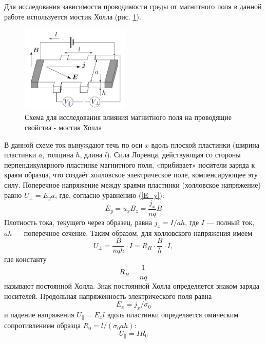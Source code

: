 \documentclass[a4paper,12pt]{article} %
\begin{document}
Для исследования зависимости проводимости среды от магнитного
поля в данной работе используется \textsf{мостик Холла} (рис. \ref{мостик}).
\begin{figure}[h!]
\begin{center}
\includegraphics[width=0.46\textwidth]{Мостик}
\caption{Схема для исследования влияния магнитного поля на проводящие
свойства - мостик Холла} \label{мостик}
\end{center}
\end{figure}
В данной схеме ток вынуждают
течь по оси $x$ вдоль плоской пластинки (ширина пластинки $a$, толщина $h$,
длина $l$). Сила Лоренца, действующая со стороны перпендикулярного
пластинке магнитного поля, «прибивает» носители заряда к краям образца,
что создаёт холловское электрическое поле, компенсирующее эту
силу. Поперечное напряжение между краями пластинки (\textsf{холловское 
напряжение}) равно $U_\perp = E_ya$, где, согласно уравнению (\ref{E_y}):
\begin{equation}
E_y=u_xB_z=\dfrac{j_x}{nq}B
\end{equation}
Плотность тока, текущего через образец, равна $j_x=I/ah$, где $I$ — полный
ток, $ah$ — поперечное сечение. Таким образом, для холловского напряжения
имеем
\begin{equation}
U_\perp = \frac{B}{nqh}\cdot I=R_H\cdot \frac{B}{h}\cdot I,
\end{equation}
где константу
\begin{equation}
R_H = \frac{1}{nq}
\end{equation}
называют \textsf{постоянной Холла}. Знак постоянной Холла определяется
знаком заряда носителей.
Продольная напряжённость электрического поля равна
\begin{equation}
E_x=j_x/\sigma_0
\end{equation}
и падение напряжения $U_\parallel = E_x l$ вдоль пластинки определяется омическим
сопротивлением образца $R_0 = l/(\sigma_0 a h)$:
\begin{equation}
U_\parallel = IR_0
\end{equation}
 
\end{document}
